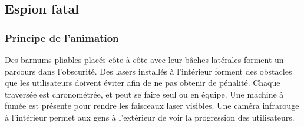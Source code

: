 \documentclass[hidelinks, paper=a4, fontsize=13pt]{report}
\begin{document}
%
%	
%

\subsection{Espion fatal}
\subsubsection{Principe de l’animation}

Des barnums pliables placés côte à côte avec leur bâches latérales forment un parcours dans l’obscurité. Des lasers installés à l’intérieur forment des obstacles que les utilisateurs doivent éviter afin de ne pas obtenir de pénalité. Chaque traversée est chronométrée, et peut se faire seul ou en équipe. Une machine à fumée est présente pour rendre les faisceaux laser visibles. Une caméra infrarouge à l’intérieur permet aux gens à l’extérieur de voir la progression des utilisateurs. 
\end{document}
